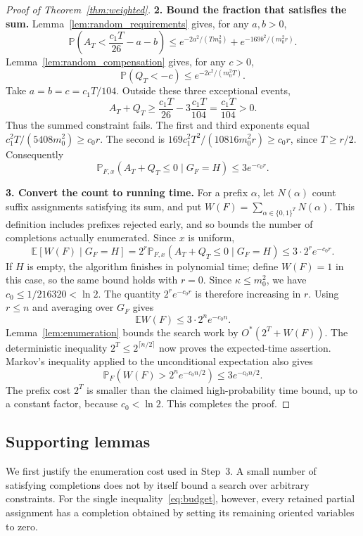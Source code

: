 \documentclass[11pt,a4paper]{article}
\theoremstyle{definition}
\theoremstyle{remark}
\newcommand{\Ostar}{O^{*}}
\newcommand{\E}{\mathbb E}
\newcommand{\Prb}{\mathbb P}
\newcommand{\bits}{\{0,1\}}
\begin{document}
\begin{proof}[Proof of Theorem~\ref{thm:weighted}]
\par\medskip\noindent\textbf{2. Bound the fraction that satisfies the sum.}
Lemma~\ref{lem:random_requirements} gives, for any $a,b>0$,
\[
 \Prb\left(A_T<\frac{c_1T}{26}-a-b\right)
 \le e^{-2a^2/(Tm_0^2)}+e^{-169b^2/(m_0^2r)}.
\]
Lemma~\ref{lem:random_compensation} gives, for any $c>0$,
\[
 \Prb(Q_T<-c)\le e^{-2c^2/(m_0^2T)}.
\]
Take $a=b=c=c_1T/104$. Outside these three exceptional events,
\[
 A_T+Q_T\ge\frac{c_1T}{26}
              -3\frac{c_1T}{104}
          =\frac{c_1T}{104}>0.
\]
Thus the summed constraint fails. The first and third exponents equal
$c_1^2T/(5408m_0^2)\ge c_0r$.
The second is
$169c_1^2T^2/(10816m_0^2r)\ge c_0r$, since $T\ge r/2$.
Consequently
\[
 \Prb_{F,x}(A_T+Q_T\le0\mid G_F=H)\le3e^{-c_0r}.
\]

\par\medskip\noindent\textbf{3. Convert the count to running time.}
For a prefix $\alpha$, let $N(\alpha)$ count suffix assignments satisfying
its sum, and put $W(F)=\sum_{\alpha\in\bits^T}N(\alpha)$.
This definition includes prefixes rejected early, and so bounds the
number of completions actually enumerated. Since $x$ is uniform,
\[
 \E[W(F)\mid G_F=H]
 =2^r\Prb_{F,x}(A_T+Q_T\le0\mid G_F=H)
 \le3\cdot2^r e^{-c_0r}.
\]
If $H$ is empty, the algorithm finishes in polynomial time; define
$W(F)=1$ in this case, so the same bound holds with $r=0$.
Since $\kappa\le m_0^2$, we have $c_0\le1/216320<\ln2$.
The quantity $2^r e^{-c_0r}$ is therefore increasing in $r$.
Using $r\le n$ and averaging over $G_F$ gives
\[
 \E W(F)\le3\cdot2^n e^{-c_0n}.
\]
Lemma~\ref{lem:enumeration} bounds the search work by
$\Ostar(2^T+W(F))$. The deterministic inequality
$2^T\le2^{\lceil n/2\rceil}$ now proves the expected-time assertion.
Markov's inequality applied to the unconditional expectation also gives
\[
 \Prb_F\left(W(F)>2^n e^{-c_0n/2}\right)
 \le3e^{-c_0n/2}.
\]
The prefix cost $2^T$ is smaller than the claimed high-probability time
bound, up to a constant factor, because $c_0<\ln2$.
This completes the proof.
\end{proof}

\subsection{Supporting lemmas}

We first justify the enumeration cost used in Step~3. A small number of
satisfying completions does not by itself bound a search over arbitrary
constraints. For the single inequality~\eqref{eq:budget}, however, every
retained partial assignment has a completion obtained by setting its
remaining oriented variables to zero.
\end{document}
